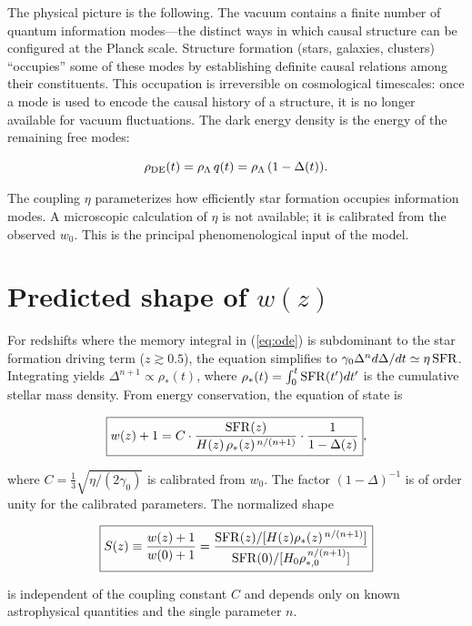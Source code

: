 \documentclass[12pt,a4paper]{article}
\begin{document}
The physical picture is the following. The vacuum contains a finite number of quantum information modes---the distinct ways in which causal structure can be configured at the Planck scale. Structure formation (stars, galaxies, clusters) ``occupies'' some of these modes by establishing definite causal relations among their constituents. This occupation is irreversible on cosmological timescales: once a mode is used to encode the causal history of a structure, it is no longer available for vacuum fluctuations. The dark energy density is the energy of the remaining free modes:

\begin{equation}
\rho_{\rm DE}(t) = \rho_\Lambda\,q(t) = \rho_\Lambda\,(1-\Delta(t)).
\end{equation}

The coupling $\eta$ parameterizes how efficiently star formation occupies information modes. A microscopic calculation of $\eta$ is not available; it is calibrated from the observed $w_0$. This is the principal phenomenological input of the model.

\section*{Predicted shape of $w(z)$}

For redshifts where the memory integral in (\ref{eq:ode}) is subdominant to the star formation driving term ($z\gtrsim0.5$), the equation simplifies to $\gamma_0\Delta^n d\Delta/dt\simeq\eta\,{\rm SFR}$. Integrating yields $\Delta^{n+1}\propto\rho_*(t)$, where $\rho_*(t)=\int_0^t{\rm SFR}(t')dt'$ is the cumulative stellar mass density. From energy conservation, the equation of state is

\begin{equation}\label{eq:shape}
\boxed{w(z)+1 = C\cdot\frac{{\rm SFR}(z)}{H(z)\,\rho_*(z)^{\,n/(n+1)}}\cdot\frac{1}{1-\Delta(z)}},
\end{equation}

where $C=\frac{1}{3}\sqrt{\eta/(2\gamma_0)}$ is calibrated from $w_0$. The factor $(1-\Delta)^{-1}$ is of order unity for the calibrated parameters. The normalized shape

\begin{equation}\label{eq:norm}
\boxed{S(z)\equiv\frac{w(z)+1}{w(0)+1} = \frac{{\rm SFR}(z)/[H(z)\rho_*(z)^{\,n/(n+1)}]}{{\rm SFR}(0)/[H_0\rho_{*,0}^{\,n/(n+1)}]}}
\end{equation}

is independent of the coupling constant $C$ and depends only on known astrophysical quantities and the single parameter $n$.
\end{document}
